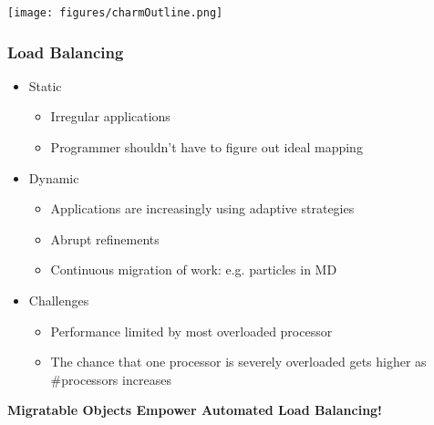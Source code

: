 \begin{frame}[fragile]
\texttt{[image: figures/charmOutline.png]}
\end{frame}

\begin{frame}[fragile]
\frametitle{Load Balancing}
\begin{itemize}
 \item Static
   \begin{itemize}
   \item Irregular applications
   \item Programmer shouldn't have to figure out ideal mapping
   \end{itemize}
 \item Dynamic
   \begin{itemize}
   \item Applications are increasingly using adaptive strategies
   \item Abrupt refinements
   \item Continuous migration of work: e.g. particles in MD
   \end{itemize}
 \item Challenges
   \begin{itemize}
   \item Performance limited by most overloaded processor
   \item The chance that one processor is severely overloaded gets higher as
     \#processors increases
   \end{itemize}
\end{itemize}
\begin{center}\textbf{Migratable Objects Empower Automated Load Balancing!}\end{center}
\end{frame}




